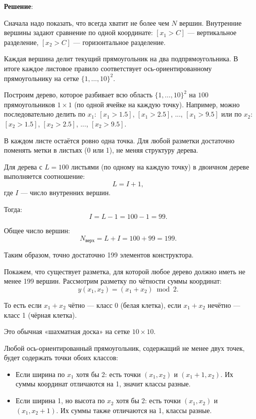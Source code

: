 \documentclass[pract]{SCWorks}
\begin{document}
    \textbf{Решение}:

    Сначала надо показать, что всегда хватит не более чем $N$ вершин.
    Внутренние вершины задают сравнение по одной координате: $[x_1 > C]$ — вертикальное разделение, $[x_2 > C]$ — горизонтальное разделение.

    Каждая вершина делит текущий прямоугольник на два подпрямоугольника.
    В итоге каждое листовое правило соответствует ось-ориентированному прямоугольнику на сетке $\{1,\dots,10\}^2$.

    Построим дерево, которое разбивает всю область $\{1,\dots,10\}^2$ на $100$ прямоугольников $1 \times 1$ (по одной ячейке на каждую точку).
    Например, можно последовательно делить по $x_1$: $[x_1 > 1.5]$, $[x_1 > 2.5]$, ..., $[x_1 > 9.5]$ или по $x_2$: $[x_2 > 1.5]$, $[x_2 > 2.5]$, ..., $[x_2 > 9.5]$.

    В каждом листе остаётся ровно одна точка.
    Для любой разметки достаточно поменять метки в листьях (0 или 1), не меняя структуру дерева.

    Для дерева с $L = 100$ листьями (по одному на каждую точку) в двоичном дереве выполняется соотношение:
    \[
    L = I + 1,
    \]
    где $I$ — число внутренних вершин.

    Тогда:
    \[
    I = L - 1 = 100 - 1 = 99.
    \]

    Общее число вершин:
    \[
    N_{\text{верх}} = L + I = 100 + 99 = 199.
    \]

    Таким образом, точно достаточно 199 элементов конструктора.

    Покажем, что существует разметка, для которой любое дерево должно иметь не менее 199 вершин.
    Рассмотрим разметку по чётности суммы координат:
    \[
    y(x_1,x_2) = (x_1 + x_2) \bmod 2.
    \]

    То есть если $x_1 + x_2$ чётно — класс 0 (белая клетка), если $x_1 + x_2$ нечётно — класс 1 (чёрная клетка).

    Это обычная «шахматная доска» на сетке $10 \times 10$.

    Любой ось-ориентированный прямоугольник, содержащий не менее двух точек, будет содержать точки обоих классов:
    \begin{itemize}
        \item[$\bullet$] Если ширина по $x_1$ хотя бы 2: есть точки $(x_1, x_2)$ и $(x_1+1, x_2)$. Их суммы координат отличаются на 1, значит классы разные.
        \item[$\bullet$] Если ширина 1, но высота по $x_2$ хотя бы 2: есть точки $(x_1, x_2)$ и $(x_1, x_2+1)$. Их суммы также отличаются на 1, классы разные.
    \end{itemize}
\end{document}
